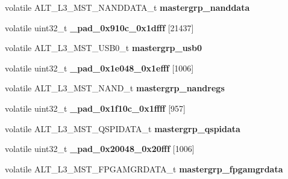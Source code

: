 \begin{DoxyCompactItemize}
\mbox{\label{structALT__L3__MSTGRP__s_a0e25b18e8ab73a9c9deda5a77c104274}} 
volatile A\+L\+T\+\_\+\+L3\+\_\+\+M\+S\+T\+\_\+\+N\+A\+N\+D\+D\+A\+T\+A\+\_\+t {\bfseries mastergrp\+\_\+nanddata}
\item 
\mbox{\label{structALT__L3__MSTGRP__s_acdacbe13cc4b60b7a4b6571b75c83301}} 
volatile uint32\+\_\+t {\bfseries \+\_\+pad\+\_\+0x910c\+\_\+0x1dfff} \mbox{[}21437\mbox{]}
\item 
\mbox{\label{structALT__L3__MSTGRP__s_a8ae648b69eddec80563a162776b8a90b}} 
volatile A\+L\+T\+\_\+\+L3\+\_\+\+M\+S\+T\+\_\+\+U\+S\+B0\+\_\+t {\bfseries mastergrp\+\_\+usb0}
\item 
\mbox{\label{structALT__L3__MSTGRP__s_a336335297725b48db3ad723f6c9e7904}} 
volatile uint32\+\_\+t {\bfseries \+\_\+pad\+\_\+0x1e048\+\_\+0x1efff} \mbox{[}1006\mbox{]}
\item 
\mbox{\label{structALT__L3__MSTGRP__s_ad7c9e8470b7fe433c0b3ebd72b58b385}} 
volatile A\+L\+T\+\_\+\+L3\+\_\+\+M\+S\+T\+\_\+\+N\+A\+N\+D\+\_\+t {\bfseries mastergrp\+\_\+nandregs}
\item 
\mbox{\label{structALT__L3__MSTGRP__s_a5a122be18cd6c6ef84fa98ede8e7ac4e}} 
volatile uint32\+\_\+t {\bfseries \+\_\+pad\+\_\+0x1f10c\+\_\+0x1ffff} \mbox{[}957\mbox{]}
\item 
\mbox{\label{structALT__L3__MSTGRP__s_a118ca4bb259f86a0bf758fc2b8316634}} 
volatile A\+L\+T\+\_\+\+L3\+\_\+\+M\+S\+T\+\_\+\+Q\+S\+P\+I\+D\+A\+T\+A\+\_\+t {\bfseries mastergrp\+\_\+qspidata}
\item 
\mbox{\label{structALT__L3__MSTGRP__s_ad87c2ab0eaf7fc4cebe2fd27c187d205}} 
volatile uint32\+\_\+t {\bfseries \+\_\+pad\+\_\+0x20048\+\_\+0x20fff} \mbox{[}1006\mbox{]}
\item 
\mbox{\label{structALT__L3__MSTGRP__s_aa90aeb77444e6604618ade91f7e4dc63}} 
volatile A\+L\+T\+\_\+\+L3\+\_\+\+M\+S\+T\+\_\+\+F\+P\+G\+A\+M\+G\+R\+D\+A\+T\+A\+\_\+t {\bfseries mastergrp\+\_\+fpgamgrdata}

\end{DoxyCompactItemize}

